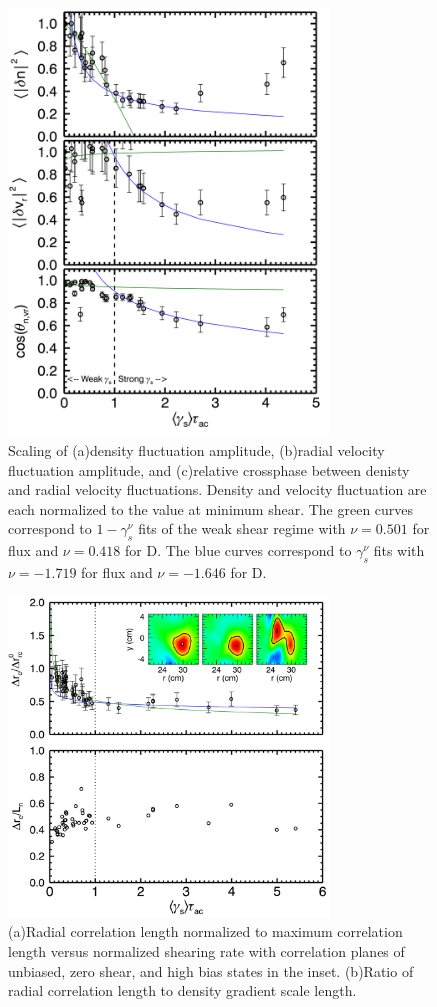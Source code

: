 \documentclass[aip,pop,amsmath,amssymb,reprint,superscriptaddress]{revtex4-1} %
\begin{document}
\begin{figure}[!htbp]
\centerline{
\includegraphics[width=8.5cm]{densvrcp}}
\caption{\label{fig:densvrcp} Scaling of (a)density fluctuation amplitude, (b)radial velocity fluctuation amplitude, and (c)relative crossphase between denisty and radial velocity fluctuations. Density and velocity fluctuation are each normalized to the value at minimum shear. The green curves correspond to $1-\gamma_{s}^{\nu}$ fits of the weak shear regime with $\nu = 0.501$ for flux and $\nu = 0.418$ for D. The blue curves correspond to $\gamma_{s}^{\nu}$ fits with $\nu = -1.719$ for flux and $\nu = -1.646$ for D.}
\end{figure}

\begin{figure}[!htbp]
\centerline{
\includegraphics[width=8.5cm]{RadCorrLn}}
\caption{\label{fig:radcorr} (a)Radial correlation length normalized to maximum correlation length versus normalized shearing rate with correlation planes of unbiased, zero shear, and high bias states in the inset. (b)Ratio of radial correlation length to density gradient scale length.}
\end{figure}
\end{document}
